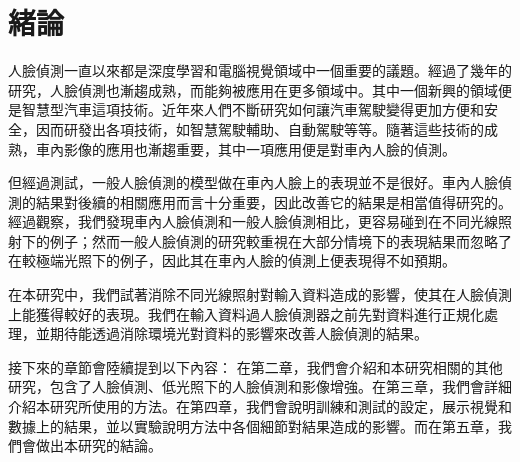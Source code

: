 \chapter{緒論}
\label{c:intro}

人臉偵測一直以來都是深度學習和電腦視覺領域中一個重要的議題。經過了幾年的研究，人臉偵測也漸趨成熟，而能夠被應用在更多領域中。其中一個新興的領域便是智慧型汽車這項技術。近年來人們不斷研究如何讓汽車駕駛變得更加方便和安全，因而研發出各項技術，如智慧駕駛輔助、自動駕駛等等。隨著這些技術的成熟，車內影像的應用也漸趨重要，其中一項應用便是對車內人臉的偵測。

但經過測試，一般人臉偵測的模型做在車內人臉上的表現並不是很好。車內人臉偵測的結果對後續的相關應用而言十分重要，因此改善它的結果是相當值得研究的。經過觀察，我們發現車內人臉偵測和一般人臉偵測相比，更容易碰到在不同光線照射下的例子；然而一般人臉偵測的研究較重視在大部分情境下的表現結果而忽略了在較極端光照下的例子，因此其在車內人臉的偵測上便表現得不如預期。

在本研究中，我們試著消除不同光線照射對輸入資料造成的影響，使其在人臉偵測上能獲得較好的表現。我們在輸入資料過人臉偵測器之前先對資料進行正規化處理，並期待能透過消除環境光對資料的影響來改善人臉偵測的結果。

接下來的章節會陸續提到以下內容：
在第二章，我們會介紹和本研究相關的其他研究，包含了人臉偵測、低光照下的人臉偵測和影像增強。在第三章，我們會詳細介紹本研究所使用的方法。在第四章，我們會說明訓練和測試的設定，展示視覺和數據上的結果，並以實驗說明方法中各個細節對結果造成的影響。而在第五章，我們會做出本研究的結論。

